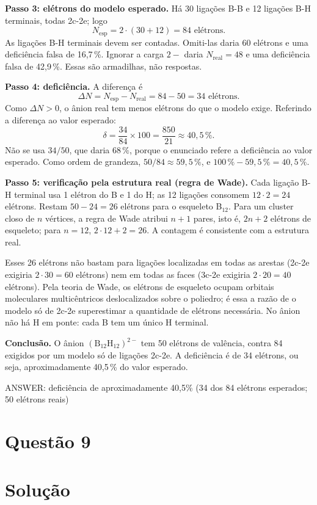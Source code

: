\documentclass{article}%
\begin{document}
\textbf{Passo 3: elétrons do modelo esperado.} Há 30 ligações B-B e 12 ligações B-H terminais, todas 2c-2e; logo
\[
N_{\text{esp}} = 2\cdot (30 + 12) = 84 \text{ elétrons}.
\]
As ligações B-H terminais devem ser contadas. Omiti-las daria 60 elétrons e uma deficiência falsa de 16,7\,\%. Ignorar a carga $2-$ daria $N_{\text{real}} = 48$ e uma deficiência falsa de 42,9\,\%. Essas são armadilhas, não respostas.

\textbf{Passo 4: deficiência.} A diferença é
\[
\Delta N = N_{\text{esp}} - N_{\text{real}} = 84 - 50 = 34 \text{ elétrons}.
\]
Como $\Delta N > 0$, o ânion real tem menos elétrons do que o modelo exige. Referindo a diferença ao valor esperado:
\[
\delta = \frac{34}{84}\times 100 = \frac{850}{21} \approx 40{,}5\,\%.
\]
Não se usa $34/50$, que daria $68\,\%$, porque o enunciado refere a deficiência ao valor esperado. Como ordem de grandeza, $50/84 \approx 59{,}5\,\%$, e $100\,\% - 59{,}5\,\% = 40{,}5\,\%$.

\textbf{Passo 5: verificação pela estrutura real (regra de Wade).} Cada ligação B-H terminal usa 1 elétron do B e 1 do H; as 12 ligações consomem $12\cdot 2 = 24$ elétrons. Restam $50 - 24 = 26$ elétrons para o esqueleto B$_{12}$. Para um cluster closo de $n$ vértices, a regra de Wade atribui $n+1$ pares, isto é, $2n+2$ elétrons de esqueleto; para $n = 12$, $2\cdot 12 + 2 = 26$. A contagem é consistente com a estrutura real.

Esses 26 elétrons não bastam para ligações localizadas em todas as arestas (2c-2e exigiria $2\cdot 30 = 60$ elétrons) nem em todas as faces (3c-2e exigiria $2\cdot 20 = 40$ elétrons). Pela teoria de Wade, os elétrons de esqueleto ocupam orbitais moleculares multicêntricos deslocalizados sobre o poliedro; é essa a razão de o modelo só de 2c-2e superestimar a quantidade de elétrons necessária. No ânion não há H em ponte: cada B tem um único H terminal.

\textbf{Conclusão.} O ânion $(\text{B}_{12}\text{H}_{12})^{2-}$ tem 50 elétrons de valência, contra 84 exigidos por um modelo só de ligações 2c-2e. A deficiência é de 34 elétrons, ou seja, aproximadamente 40,5\,\% do valor esperado.

ANSWER: deficiência de aproximadamente 40,5\% (34 dos 84 elétrons esperados; 50 elétrons reais)%
\newpage%
\section*{Questão 9}

\section*{Solução}
\end{document}
